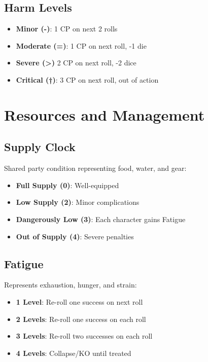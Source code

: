 \documentclass[11pt,twoside]{article}
\begin{document}
\subsection{Harm Levels}
\begin{itemize}[leftmargin=*]
    \item \textbf{Minor (-)}: 1 CP on next 2 rolls
    \item \textbf{Moderate (=)}: 1 CP on next roll, -1 die
    \item \textbf{Severe (>) } 2 CP on next roll, -2 dice
    \item \textbf{Critical (†)}: 3 CP on next roll, out of action
\end{itemize}

\section{Resources and Management}

\subsection{Supply Clock}
Shared party condition representing food, water, and gear:
\begin{itemize}[leftmargin=*]
    \item \textbf{Full Supply (0)}: Well-equipped
    \item \textbf{Low Supply (2)}: Minor complications
    \item \textbf{Dangerously Low (3)}: Each character gains Fatigue
    \item \textbf{Out of Supply (4)}: Severe penalties
\end{itemize}

\subsection{Fatigue}
Represents exhaustion, hunger, and strain:
\begin{itemize}[leftmargin=*]
    \item \textbf{1 Level}: Re-roll one success on next roll
    \item \textbf{2 Levels}: Re-roll one success on each roll
    \item \textbf{3 Levels}: Re-roll two successes on each roll
    \item \textbf{4 Levels}: Collapse/KO until treated
\end{itemize}
\end{document}
